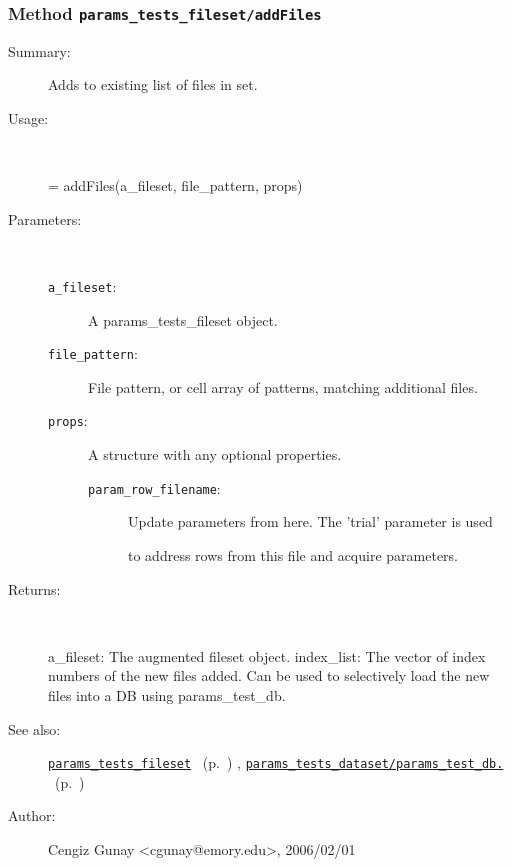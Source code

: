 \subsubsection[Method \texttt{addFiles}]{Method \texttt{params\_tests\_fileset/addFiles}}%
%
\label{ref_params_tests_fileset__addFiles}%
\hypertarget{ref_params_tests_fileset__addFiles}{}%
\begin{description}
\item[Summary:]Adds to existing list of files in set.
%
\item[Usage:]~%
\begin{lyxcode}%
[a\_fileset, index\_list] = addFiles(a\_fileset, file\_pattern, props)
%
\end{lyxcode}%
%
%
\item[Parameters:]~
\begin{description}%
\item[\texttt{a\_fileset}:]
 A params\_tests\_fileset object.
\item[\texttt{file\_pattern}:]
 File pattern, or cell array of patterns, matching additional files.
\item[\texttt{props}:]
 A structure with any optional properties.
\begin{description}%
\item[\texttt{param\_row\_filename}:]
 Update parameters from here. The 'trial' parameter is used

to address rows from this file and acquire parameters.\end{description}%
\end{description}%
%
\item[Returns:]~

	a\_fileset: The augmented fileset object.
	index\_list: The vector of index numbers of the new files added. Can be used
		to selectively load the new files into a DB using params\_test\_db.
%
%
\item[See also:]%
\hyperlink{ref_params_tests_fileset}{\texttt{params\_tests\_fileset}}%
\ (p.~\pageref{ref_params_tests_fileset})%
%
, \hyperlink{ref_params_tests_dataset__params_test_db.}{\texttt{params\_tests\_dataset/params\_test\_db.}}%
\ (p.~\pageref{ref_params_tests_dataset__params_test_db.})%
%
%
\item[Author:]%
Cengiz Gunay <cgunay@emory.edu>, 2006/02/01%
\end{description}
\methodline%
